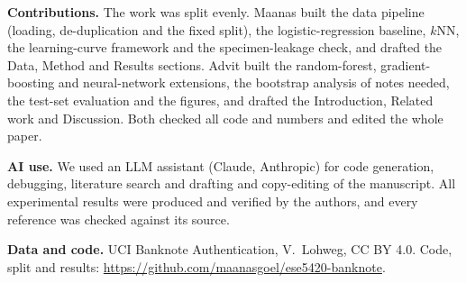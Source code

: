\begin{ack}
\textbf{Contributions.} The work was split evenly. Maanas built the data pipeline (loading, de-duplication and the fixed split), the logistic-regression baseline, $k$NN, the learning-curve framework and the specimen-leakage check, and drafted the Data, Method and Results sections. Advit built the random-forest, gradient-boosting and neural-network extensions, the bootstrap analysis of notes needed, the test-set evaluation and the figures, and drafted the Introduction, Related work and Discussion. Both checked all code and numbers and edited the whole paper.

\textbf{AI use.} We used an LLM assistant (Claude, Anthropic) for code generation, debugging, literature search and drafting and copy-editing of the manuscript. All experimental results were produced and verified by the authors, and every reference was checked against its source.

\textbf{Data and code.} UCI Banknote Authentication, V.~Lohweg, CC BY 4.0. Code, split and results: \url{https://github.com/maanasgoel/ese5420-banknote}.
\end{ack}
